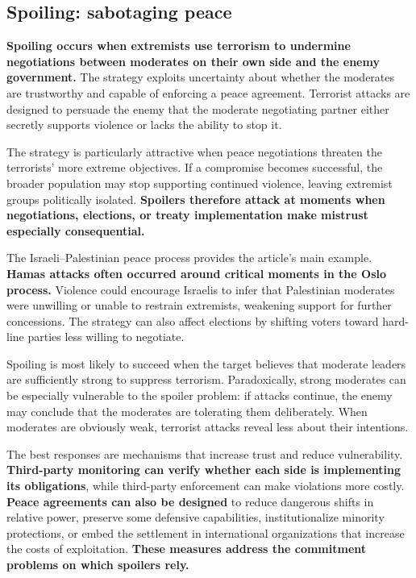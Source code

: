 \subsection{Spoiling: sabotaging peace}

\textbf{Spoiling occurs when extremists use terrorism to undermine negotiations between moderates on their own side and the enemy government.} The strategy exploits uncertainty about whether the moderates are trustworthy and capable of enforcing a peace agreement. Terrorist attacks are designed to persuade the enemy that the moderate negotiating partner either secretly supports violence or lacks the ability to stop it.

The strategy is particularly attractive when peace negotiations threaten the terrorists' more extreme objectives. If a compromise becomes successful, the broader population may stop supporting continued violence, leaving extremist groups politically isolated. \textbf{Spoilers therefore attack at moments when negotiations, elections, or treaty implementation make mistrust especially consequential.}

The Israeli--Palestinian peace process provides the article's main example. \textbf{Hamas attacks often occurred around critical moments in the Oslo process.} Violence could encourage Israelis to infer that Palestinian moderates were unwilling or unable to restrain extremists, weakening support for further concessions. The strategy can also affect elections by shifting voters toward hard-line parties less willing to negotiate.

Spoiling is most likely to succeed when the target believes that moderate leaders are sufficiently strong to suppress terrorism. Paradoxically, strong moderates can be especially vulnerable to the spoiler problem: if attacks continue, the enemy may conclude that the moderates are tolerating them deliberately. When moderates are obviously weak, terrorist attacks reveal less about their intentions.

The best responses are mechanisms that increase trust and reduce vulnerability. \textbf{Third-party monitoring can verify whether each side is implementing its obligations}, while third-party enforcement can make violations more costly. \textbf{Peace agreements can also be designed} to reduce dangerous shifts in relative power, preserve some defensive capabilities, institutionalize minority protections, or embed the settlement in international organizations that increase the costs of exploitation. \textbf{These measures address the commitment problems on which spoilers rely.}

